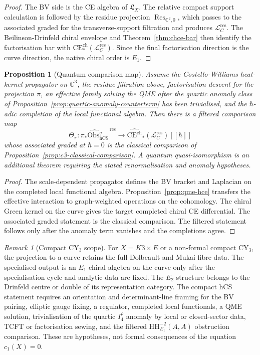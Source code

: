 \documentclass[11pt]{amsart}
\providecommand{\C}{\mathbb{C}}
\providecommand{\Lfrak}{\mathfrak{L}}
\providecommand{\chCE}{\mathrm{CE}^{\mathrm{ch}}}
\providecommand{\hCS}{\mathrm{hCS}}
\providecommand{\cL}{\mathcal{L}}
\providecommand{\Obs}{\mathrm{Obs}}
\providecommand{\HH}{\mathrm{HH}}
\theoremstyle{plain}
\newtheorem{proposition}[theorem]{Proposition}
\theoremstyle{definition}
\theoremstyle{remark}
\newtheorem{remark}[theorem]{Remark}
\begin{document}
\begin{proof}
The BV side is the CE algebra of $\Lfrak_X$.  The relative compact
support calculation is followed by the residue projection
\(\operatorname{Res}_{\C^2,0}\), which passes to the associated graded
for the transverse-support filtration and produces
\(\cL_C^{\mathrm{res}}\).  The
Beilinson-Drinfeld chiral envelope and Theorem~\ref{thm:chce-bar}
then identify the factorisation bar with
$\chCE_*(\cL_C^{\mathrm{res}})$.  Since the final factorisation
direction is the curve direction, the native chiral order is $E_1$.
\end{proof}

\begin{proposition}[Quantum comparison map]
\label{prop:c3-quantum-comparison}
Assume the Costello-Williams heat-kernel propagator on $\C^3$, the
residue filtration above, factorisation descent for the projection
\(\pi\), an effective family solving the QME after the quartic anomaly
class of
Proposition~\ref{prop:quartic-anomaly-counterterm} has been
trivialised, and the $\hbar$-adic completion of the local functional
algebra.  Then there is a filtered comparison map
\[
  \Theta_\pi:
  \widehat{\pi_*\Obs^q_{\hCS}}^{\,\mathrm{res}}
  \longrightarrow
  \widehat{\chCE}_*(\cL_C^{\mathrm{res}})[[\hbar]]
\]
whose associated graded at $\hbar=0$ is the classical comparison of
Proposition~\ref{prop:c3-classical-comparison}.  A quantum
quasi-isomorphism is an additional theorem requiring the stated
renormalisation and anomaly hypotheses.
\end{proposition}

\begin{proof}
The scale-dependent propagator defines the BV bracket and Laplacian on
the completed local functional algebra.  Proposition~\ref{prop:qme-hce}
transfers the effective interaction to graph-weighted operations on the
cohomology.  The chiral Green kernel on the curve gives the target
completed chiral CE differential.  The associated graded statement is
the classical comparison.  The filtered statement follows only after
the anomaly term vanishes and the completions agree.
\end{proof}

\begin{remark}[Compact CY$_3$ scope]
\label{rmk:compact-cy3-scope}
For $X=K3\times E$ or a non-formal compact CY$_3$, the projection to a
curve retains the full Dolbeault and Mukai fibre data.  The specialised
output is an $E_1$-chiral algebra on the curve only after the
specialisation cycle and analytic data are fixed.  The $E_2$ structure
belongs to the Drinfeld centre or double of its representation
category.  The compact hCS statement requires an orientation and
determinant-line framing for the BV pairing, elliptic gauge fixing, a
regulator, completed local functionals, a QME solution, trivialisation
of the quartic \(I_4^\rho\) anomaly by local or closed-sector data,
TCFT or factorisation sewing, and the filtered
$\HH^{-2}_{E_1}(A,A)$ obstruction comparison.  These are hypotheses,
not formal consequences of the equation \(c_1(X)=0\).
\end{remark}
\end{document}
